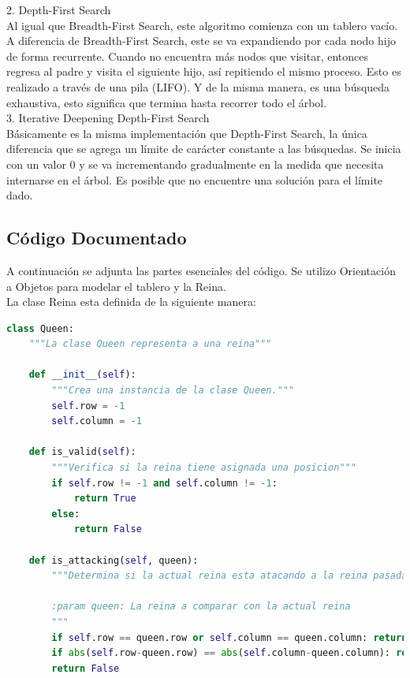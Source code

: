 \documentclass[letter, 10pt]{article}
\begin{document}
\begin{description}
2. Depth-First Search \\
Al igual que Breadth-First Search, este algoritmo comienza con un tablero vacío. A diferencia de Breadth-First Search, este se va expandiendo por cada nodo hijo de forma recurrente. Cuando no encuentra más nodos que visitar, entonces regresa al padre y visita el siguiente hijo, así repitiendo el mismo proceso. Esto es realizado a través de una pila (LIFO). Y de la misma manera, es una búsqueda exhaustiva, esto significa que termina hasta recorrer todo el árbol. \\

3. Iterative Deepening Depth-First Search \\
Básicamente es la misma implementación que Depth-First Search, la única diferencia que se agrega un límite de carácter constante a las búsquedas. Se inicia con un valor 0 y se va incrementando gradualmente en la medida que necesita internarse en el árbol. Es posible que no encuentre una solución para el límite dado.

\end{description}

\subsection{Código Documentado}

A continuación se adjunta las partes esenciales del código. Se utilizo Orientación a Objetos para modelar el tablero y la Reina.\\

La clase Reina esta definida de la siguiente manera: \\

\begin{lstlisting}[language=python,frame=single]
    class Queen:
    """La clase Queen representa a una reina"""

    def __init__(self):
        """Crea una instancia de la clase Queen."""
        self.row = -1
        self.column = -1

    def is_valid(self):
        """Verifica si la reina tiene asignada una posicion"""
        if self.row != -1 and self.column != -1:
            return True
        else:
            return False

    def is_attacking(self, queen):
        """Determina si la actual reina esta atacando a la reina pasada

        :param queen: La reina a comparar con la actual reina
        """
        if self.row == queen.row or self.column == queen.column: return True
        if abs(self.row-queen.row) == abs(self.column-queen.column): return True
        return False
\end{lstlisting}
\end{document}
